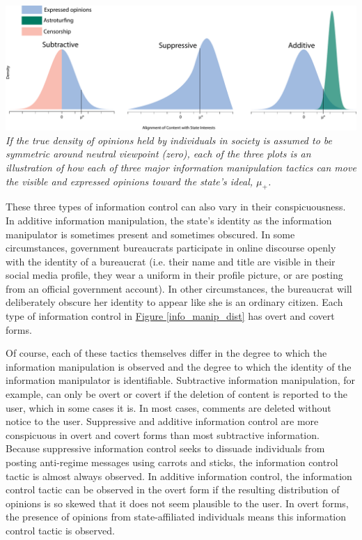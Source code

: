 \documentclass[11pt]{article}
\begin{document}
\begin{minipage}{\linewidth}
    \begin{center}
      \singlespacing
      \includegraphics[width=\textwidth]{figures/info_manip_dist.pdf}\\
      \scriptsize{\it If the true density of opinions held by individuals in society is assumed to be symmetric around neutral viewpoint (zero), each of the three plots is an illustration of how each of three major information manipulation tactics can move the visible and expressed opinions toward the state's ideal, $\mu_{+}$.}\vspace{2em}
      \label{info_manip_dist}
    \end{center}
\end{minipage}

These three types of information control can also vary in their conspicuousness. In additive information manipulation, the state's identity as the information manipulator is sometimes present and sometimes obscured. In some circumstances, government bureaucrats participate in online discourse openly with the identity of a bureaucrat (i.e. their name and title are visible in their social media profile, they wear a uniform in their profile picture, or are posting from an official government account). In other circumstances, the bureaucrat will deliberately obscure her identity to appear like she is an ordinary citizen. Each type of information control in \hyperref[info_manip_dist]{Figure \ref*{info_manip_dist}} has overt and covert forms.

Of course, each of these tactics themselves differ in the degree to which the information manipulation is observed and the degree to which the identity of the information manipulator is identifiable. Subtractive information manipulation, for example, can only be overt or covert if the deletion of content is reported to the user, which in some cases it is. In most cases, comments are deleted without notice to the user. Suppressive and additive information control are more conspicuous in overt and covert forms than most subtractive information. Because suppressive information control seeks to dissuade individuals from posting anti-regime messages using carrots and sticks, the information control tactic is almost always observed. In additive information control, the information control tactic can be observed in the overt form if the resulting distribution of opinions is so skewed that it does not seem plausible to the user. In overt forms, the presence of opinions from state-affiliated individuals means this information control tactic is observed.
\end{document}
